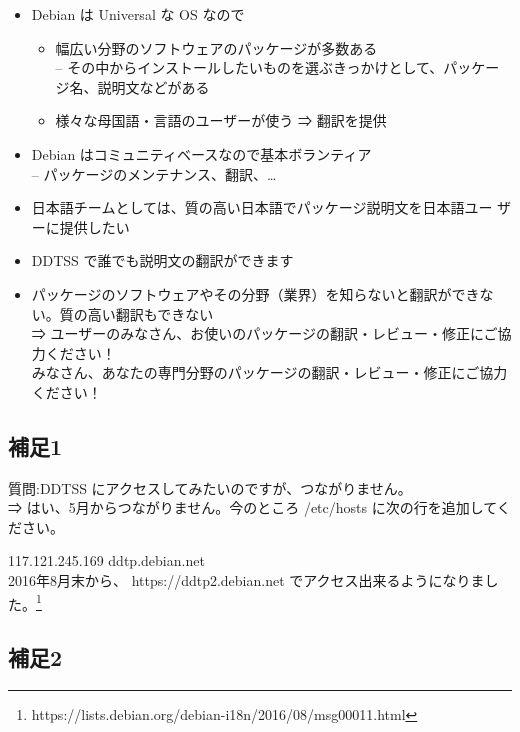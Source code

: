 \documentclass[mingoth,a4paper]{jsarticle}
\begin{document}
 \begin{itemize}
  \item Debian は Universal な OS なので
	\begin{itemize}
	 \item 幅広い分野のソフトウェアのパッケージが多数ある\\
	   -- その中からインストールしたいものを選ぶきっかけとして、パッケージ名、説明文などがある
	 \item 様々な母国語・言語のユーザーが使う ⇒ 翻訳を提供
	\end{itemize}
      \item Debian はコミュニティベースなので基本ボランティア\\
        -- パッケージのメンテナンス、翻訳、…
  \item 日本語チームとしては、質の高い日本語でパッケージ説明文を日本語ユー
	ザーに提供したい
  \item DDTSS で誰でも説明文の翻訳ができます
  \item パッケージのソフトウェアやその分野（業界）を知らないと翻訳ができない。質の高い翻訳もできない\\
    ⇒ ユーザーのみなさん、お使いのパッケージの翻訳・レビュー・修正にご協力ください！\\
    みなさん、あなたの専門分野のパッケージの翻訳・レビュー・修正にご協力ください！
 \end{itemize}

\subsection{補足1}

質問:DDTSS にアクセスしてみたいのですが、つながりません。\\

  ⇒ はい、5月からつながりません。今のところ /etc/hosts に次の行を追加してください。

  117.121.245.169 ddtp.debian.net
\\
2016年8月末から、 https://ddtp2.debian.net でアクセス出来るようになりました。\footnote{https://lists.debian.org/debian-i18n/2016/08/msg00011.html}

\subsection{補足2}
\end{document}
